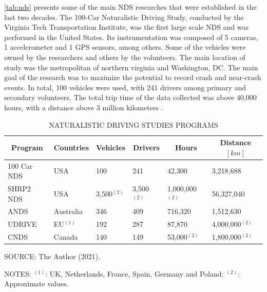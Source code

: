 \autoref{tab:nds} presents some of the main NDS researches that were established in the last two decades. The 100-Car Naturalistic Driving Study, conducted by the Virginia Tech Transportation Institute, was the first large scale NDS and was performed in the United States. Its instrumentation was composed of 5 cameras, 1 accelerometer and 1 GPS sensors, among others. Some of the vehicles were owned by the researchers and others by the volunteers. The main location of study was the metropolitan of northern virginia and Washington, DC. The main goal of the research was to maximize the potential to record crash and near-crash events. In total, 100 vehicles were used, with 241 drivers among primary and secondary volunteers. The total trip time of the data collected was above 40,000 hours, with a distance above 3 million kilometers \cite{Neale2005}.

\begin{table}[!hbtp]
    \footnotesize
    \captionsetup{justification=raggedright,
        singlelinecheck=false,
        font=footnotesize}
    \caption{NATURALISTIC DRIVING STUDIES PROGRAMS}
    \centering
    \begin{tabular}{llllll}
        \hline
        \multicolumn{1}{c}{\textbf{Program}} & \multicolumn{1}{c}{\textbf{Countries}} & \multicolumn{1}{c}{\textbf{Vehicles}} & \multicolumn{1}{c}{\textbf{Drivers}} & \multicolumn{1}{c}{\textbf{Hours}} & \multicolumn{1}{c}{\textbf{Distance} $[km]$} \\
        \hline
        100 Car NDS & USA & 100 & 241 & 42,300 & 3,218,688 \\
        SHRP2 NDS & USA & 3,500$^{(2)}$ & 3,500$^{(2)}$ & 1,000,000$^{(2)}$ & 56,327,040 \\
        ANDS & Australia & 346 & 409 & 716,320 & 1,512,630 \\
        UDRIVE & EU$^{(1)}$ & 192 & 287 & 87,870 & 4,000,000$^{(2)}$ \\
        CNDS & Canada & 140 & 149 & 53,000$^{(2)}$ & 1,800,000$^{(2)}$ \\ 
        \hline
    \end{tabular}
    \label{tab:nds}
    \par \vspace{2mm} \footnotesize \raggedright
    SOURCE: The Author (2021).
    \par \vspace{1mm} \footnotesize \raggedright
    NOTES: $^{(1)}$: UK, Netherlands, France, Spain, Germany and Poland; $^{(2)}$: Approximate values.
\end{table}

